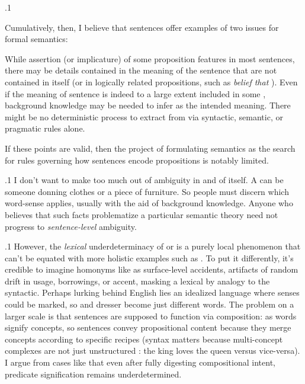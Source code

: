 \documentclass[11pt, twocolumn]{article}
\begin{document}
\p.1{%
\:\+Cumulatively, then, I believe that sentences \onethrft{} offer examples
of two issues for formal semantics:  \> \vspace{5pt}



\begin{docEnumerate}

\enumsItem{}   While assertion (or implicature) of some proposition 
features in most sentences, there may be details contained in
the meaning of the sentence that are not contained in  itself
(or in logically related propositions, such as \textit{belief that }).
\enumsItem{}  \>  Even if the meaning of sentence  is indeed to a large extent included in some
, background knowledge may be needed to infer  as the intended
meaning. \>  There might be no deterministic process to extract  from
 via syntactic, semantic, or pragmatic rules alone. \> 

\end{docEnumerate}

\nip{}%
If these points are valid, then the project of formulating semantics as the search
for rules governing how sentences  encode propositions  is notably limited.\<\;
}%

\p.1{%
\:\+I don't want to make too much out of ambiguity in and of itself. \> 
A  can be someone donning clothes or a piece of furniture. \> 
So people must discern which word-sense applies, usually with the aid of background knowledge. \> 
Anyone who believes that such facts problematize a particular semantic theory
need not progress to \textit{sentence-level} ambiguity.\<\;
}%

\p.1{%
\:\+However, the \textit{lexical} underdeterminacy of  or 
is a purely local phenomenon that can't be equated with more holistic
examples such as \onethrn{}. \>  To put it differently,
it's credible to imagine homonyms like 
as surface-level accidents, artifacts of random drift in usage, borrowings, or
accent, masking a lexical
 by analogy to the syntactic. \> 
Perhaps lurking behind English lies an idealized language where senses
could be marked, so  and  dresser become just
different words. \>  The problem on a larger scale is that sentences are supposed to
function via composition: as words signify concepts, so sentences
convey propositional content because they merge concepts according
to specific recipes (syntax matters because multi-concept complexes
are not just unstructured : the king loves the queen versus vice-versa). \> 
I argue from cases like \onethrft{} that even after fully digesting
compositional intent, predicate signification remains underdetermined.\<\;
}%
\end{document}
